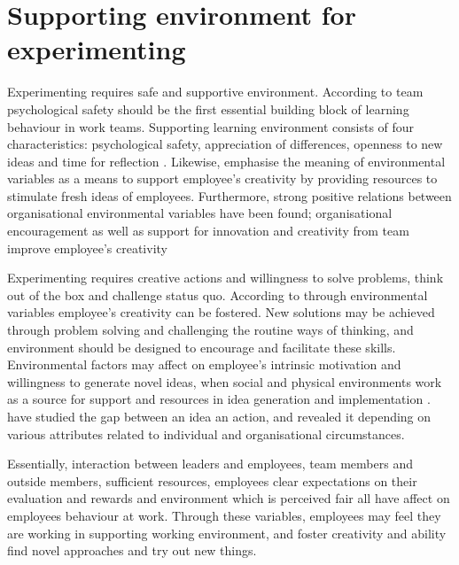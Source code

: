 \section{Supporting environment for experimenting}
Experimenting requires safe and supportive environment. According to \citet{edmondson1999psychological} team psychological safety should be the first essential building block of learning behaviour in work teams. Supporting learning environment consists of four characteristics: psychological safety, appreciation of differences, openness to new ideas and time for reflection \citep{garvin2008yours}. Likewise, \citet{mumford1988creativity} emphasise the meaning of environmental variables as a means to support employee's creativity by providing resources to stimulate fresh ideas of employees. Furthermore, strong positive relations between organisational environmental variables have been found; organisational encouragement as well as support for innovation and creativity from team improve employee's creativity \citep{amabile1996assessing}

Experimenting requires creative actions and willingness to solve problems, think out of the box and challenge status quo. According to \citet{mumford1988creativity} through environmental variables employee's creativity can be fostered. New solutions may be achieved through problem solving and challenging the routine ways of thinking, and environment should be designed to encourage and facilitate these skills. Environmental factors may affect on employee's intrinsic motivation and willingness to generate novel ideas, when social and physical environments work as a source for support and resources in idea generation and implementation \citep{amabile1998kill,mumford1988creativity}. \citet{mumford1988creativity} have studied the gap between an idea an action, and revealed it depending on various attributes related to individual and organisational circumstances.

Essentially, interaction between leaders and employees, team members and outside members, sufficient resources, employees clear expectations on their evaluation and rewards and environment which is perceived fair all have affect on employees behaviour at work. Through these variables, employees may feel they are working in supporting working environment, and foster creativity and ability find novel approaches and try out new things. \citep{shalley2004leaders} 

